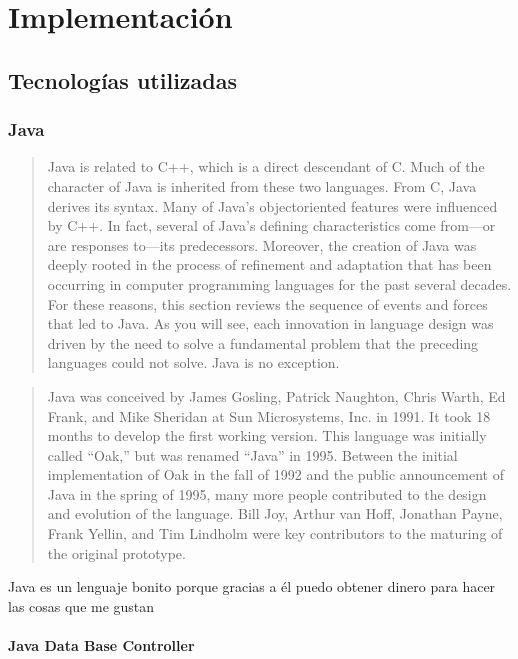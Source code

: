 \chapter{Implementación}\label{cap4}

\section{Tecnologías utilizadas}
\subsection{Java}

\begin{quote}
	Java is related to C++, which is a direct descendant of C. Much of the character of Java is inherited from these two languages. From C, Java derives its syntax. Many of Java’s objectoriented features were influenced by C++. In fact, several of Java’s defining characteristics come from—or are responses to—its predecessors. Moreover, the creation of Java was deeply rooted in the process of refinement and adaptation that has been occurring in computer programming languages for the past several decades. For these reasons, this section reviews the sequence of events and forces that led to Java. As you will see, each innovation in language design was driven by the need to solve a fundamental problem that the preceding languages could not solve. Java is no exception\cite{JavaCompleteReference}.
\end{quote}

\begin{quote}
	Java was conceived by James Gosling, Patrick Naughton, Chris Warth, Ed Frank, and Mike Sheridan at Sun Microsystems, Inc. in 1991. It took 18 months to develop the first working version. This language was initially called “Oak,” but was renamed “Java” in 1995. Between the initial implementation of Oak in the fall of 1992 and the public announcement of Java in the spring of 1995, many more people contributed to the design and evolution of the language. Bill Joy, Arthur van Hoff, Jonathan Payne, Frank Yellin, and Tim Lindholm were key contributors to the maturing of the original prototype\cite{JavaCompleteReference}.
\end{quote}

Java es un lenguaje bonito porque gracias a él puedo obtener dinero para hacer las cosas que me gustan 
\subsubsection{Java Data Base Controller}
